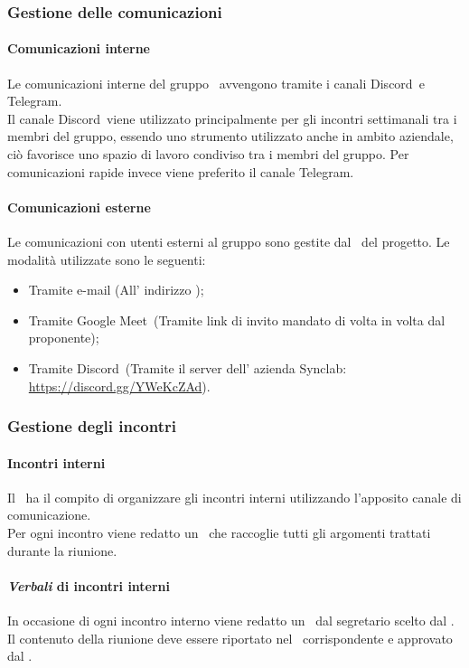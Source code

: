     \subsubsection{Gestione delle comunicazioni}
      \paragraph{Comunicazioni interne}
       Le comunicazioni interne del gruppo \groupName\ avvengono tramite i canali Discord\glo\ e Telegram\glo.\\
       Il canale Discord\glo\ viene utilizzato principalmente per gli incontri settimanali tra i membri del gruppo, essendo uno strumento utilizzato anche in ambito aziendale, ciò favorisce uno spazio di lavoro condiviso tra i membri del gruppo.
       Per comunicazioni rapide invece viene preferito il canale Telegram\glo.
      
      \paragraph{Comunicazioni esterne}
      Le comunicazioni con utenti esterni al gruppo sono gestite dal \roleProjectManagerLow\ del progetto. Le modalità utilizzate sono le seguenti:
      \begin {itemize}
        \item Tramite e-mail (All' indirizzo \groupEmail);
        \item Tramite Google Meet\glo\ (Tramite link di invito mandato di volta in volta dal proponente);
        \item Tramite Discord\glo\ (Tramite il server dell' azienda Synclab: \url{https://discord.gg/YWeKcZAd}).
      \end {itemize}

    \subsubsection{Gestione degli incontri}
      \paragraph{Incontri interni}
        Il \roleProjectManagerLow\ ha il compito di organizzare gli incontri interni utilizzando l'apposito canale di comunicazione.\\
        Per ogni incontro viene redatto un \docNameVLow\ che raccoglie tutti gli argomenti trattati durante la riunione.
      \paragraph {\textit{Verbali} di incontri interni}
      In occasione di ogni incontro interno viene redatto un \docNameVLow\ dal segretario scelto dal \roleProjectManagerLow. Il contenuto della riunione deve essere riportato nel \docNameVLow\ corrispondente e approvato dal \roleProjectManagerLow.

